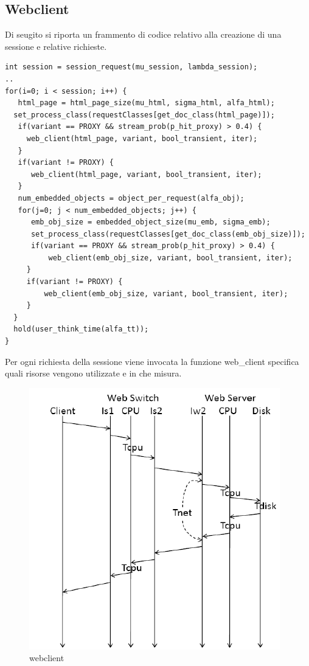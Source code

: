 \subsection{Webclient}
Di seugito si riporta un frammento di codice relativo alla creazione di una sessione e relative richieste. 
\begin{lstlisting}
int session = session_request(mu_session, lambda_session); 
..
for(i=0; i < session; i++) { 
   html_page = html_page_size(mu_html, sigma_html, alfa_html); 
  set_process_class(requestClasses[get_doc_class(html_page)]); 
   if(variant == PROXY && stream_prob(p_hit_proxy) > 0.4) { 
     web_client(html_page, variant, bool_transient, iter); 
   } 
   if(variant != PROXY) { 
      web_client(html_page, variant, bool_transient, iter); 
   } 
   num_embedded_objects = object_per_request(alfa_obj); 
   for(j=0; j < num_embedded_objects; j++) { 
      emb_obj_size = embedded_object_size(mu_emb, sigma_emb); 
      set_process_class(requestClasses[get_doc_class(emb_obj_size)]); 
      if(variant == PROXY && stream_prob(p_hit_proxy) > 0.4) { 
          web_client(emb_obj_size, variant, bool_transient, iter); 
     } 
     if(variant != PROXY) { 
         web_client(emb_obj_size, variant, bool_transient, iter); 
     } 
  } 
  hold(user_think_time(alfa_tt));
}
\end{lstlisting}
Per ogni richiesta della sessione viene invocata la funzione web\_client specifica quali risorse vengono utilizzate e in che misura. 
\begin{figure}[H]
\begin{center}
\includegraphics[scale=0.62]{etc/webclient.png}
\caption{webclient}
\label{webclient}
\end{center}
\end{figure}
